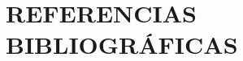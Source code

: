 \documentclass[
12pt,
a4paper,
portuges,
]{report}
\begin{document}
\makeatletter
\renewcommand{\ps@empty}{%
\renewcommand\@oddhead{\hfil\normalfont\textrm{\thepage}}%
\renewcommand\@evenhead{}%
\renewcommand\@oddfoot{}%
\renewcommand\@evenfoot{}%
}
\makeatother
\chapter*{REFERENCIAS BIBLIOGRÁFICAS}
\markboth{}{}
\printbibliography[heading=none]
% 
% 
\markboth{}{}
\begin{appendices}

\end{appendices}
\end{document}
